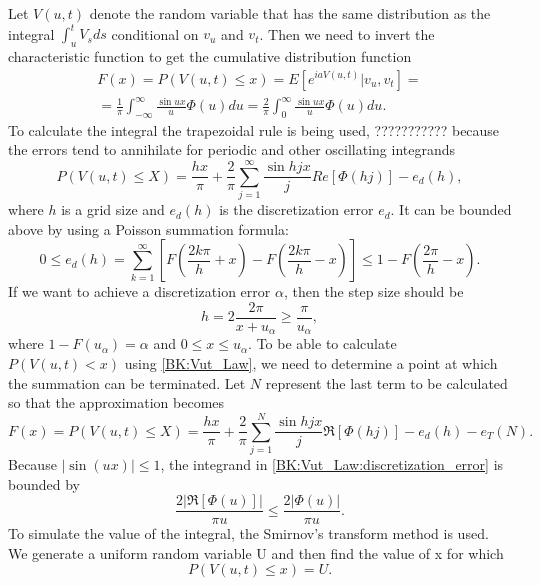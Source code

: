         Let $V(u,t)$  denote the random
        variable that has the same distribution as the integral $\int_{u}^t V_s ds$ conditional on $v_u$ and $v_t$.    
        Then we need to invert the characteristic function to get the cumulative distribution function
        \begin{multline}
            F(x) = P(V(u, t) \leq x) = E\left[ e^{iaV(u,t)} \Big| v_u, v_t\right] =\\= \frac{1}{\pi} \int_{-\infty}^\infty \frac{\sin ux}{u} \Phi(u) du 
            = \frac{2}{\pi} \int_{0}^\infty \frac{\sin ux}{u} \Phi(u) du.
        \end{multline}
        To calculate the integral the trapezoidal rule is being used, {\color{red} ??????????? because the errors tend to annihilate for periodic and other oscillating integrands}
        \begin{equation}\label{BK:Vut_Law}
            P(V(u, t) \leq X) = \frac{hx}{\pi} + \frac{2}{\pi} \sum_{j=1}^\infty \frac{\sin hjx}{j} Re[\Phi(hj)] - e_d(h),
        \end{equation}
        where $h$ is a grid size and $e_d(h)$ is the discretization error $e_d$.
        It can be bounded above by using a Poisson summation formula:
        \begin{equation}\label{BK:Vut_Law:discretization_error}
            0 \leq e_d(h) = \sum_{k=1}^\infty\left[ F\left(\frac{2k\pi}{h} + x\right) - F\left(\frac{2k\pi}{h} - x\right)\right] \leq 1 - F\left(\frac{2\pi}{h} - x\right).
        \end{equation}
        If we want to achieve a discretization error $\alpha$, then the
        step size should be
        \begin{equation}
            h = 2\frac{2\pi}{x+ u_\alpha} \geq \frac{\pi}{u_\alpha},
        \end{equation}
        where $1-F(u_\alpha) = \alpha$ and $0 \leq x \leq u_\alpha$.
        To be able to calculate $P(V(u, t) < x )$ using \eqref{BK:Vut_Law}, we
        need to determine a point at which the summation can be
        terminated. Let $N$ represent the last term to be calculated
        so that the approximation becomes
        \begin{equation}
            F(x) = P(V(u, t) \leq X) = \frac{hx}{\pi} + \frac{2}{\pi} \sum_{j=1}^N \frac{\sin hjx}{j} \Re[\Phi(hj)] - e_d(h) - e_T(N).
        \end{equation}
        Because $|\sin(ux)| \leq 1$, the integrand in \eqref{BK:Vut_Law:discretization_error} is bounded by
        \begin{equation}
            \frac{2|\Re[\Phi(u)]|}{\pi u} \leq \frac{2|\Phi(u)|}{\pi u}.
        \end{equation}
        To simulate the value of the integral, the Smirnov's transform method is used. We generate a uniform random variable U and then find the value of x for which 
        \begin{equation}
            P(V(u, t) \leq x) = U.
        \end{equation}

